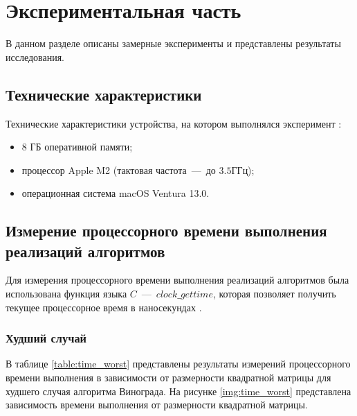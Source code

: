 \chapter{Экспериментальная часть}

В данном разделе описаны замерные эксперименты и представлены результаты исследования.

\section{Технические характеристики}
Технические характеристики устройства, на котором выполнялся эксперимент \cite{bib:5}:
\begin{itemize}
	\item 8 ГБ оперативной памяти;
	\item процессор Apple M2 (тактовая частота~---~до $3.5$ГГц);
    \item операционная система macOS Ventura 13.0.
\end{itemize}

\section{Измерение процессорного времени выполнения реализаций алгоритмов}

Для измерения процессорного времени выполнения реализаций алгоритмов была использована функция языка $C$~---~$clock\_gettime$, которая позволяет получить текущее процессорное время в наносекундах \cite{bib:6}.

\subsection{Худший случай}

В таблице \ref{table:time_worst} представлены результаты измерений процессорного времени выполнения в зависимости от размерности квадратной матрицы для худшего случая алгоритма Винограда. На рисунке \ref{img:time_worst} представлена зависимость времени выполнения от размерности квадратной матрицы.

